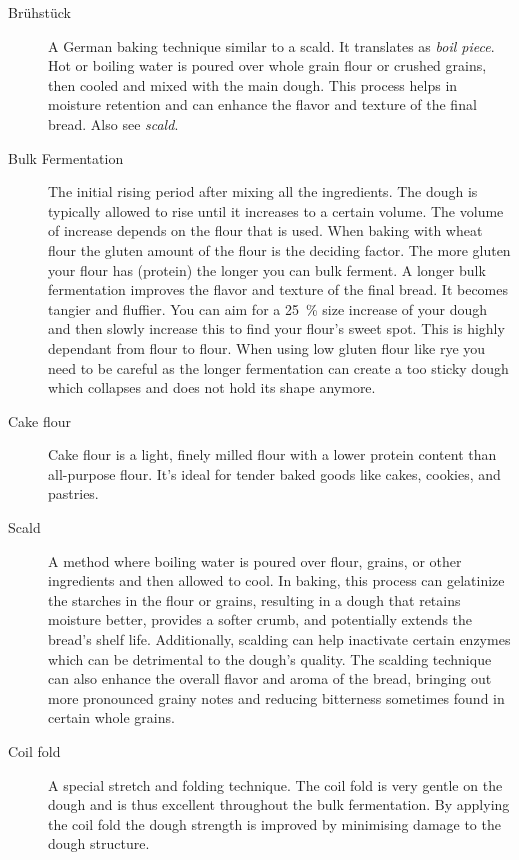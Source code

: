 \begin{description}
\item[Brühstück] A German baking technique similar to a scald. It translates as
\emph{boil piece}. Hot or boiling water is poured over whole grain flour or crushed grains,
then cooled and mixed with the main dough. This process helps in moisture retention
and can enhance the flavor and texture of the final bread. Also see \emph{scald}.

\item[Bulk Fermentation] The initial rising period after mixing all the ingredients.
The dough is typically allowed to rise until it increases to a certain volume. The
volume of increase depends on the flour that is used. When baking with wheat flour
the gluten amount of the flour is the deciding factor. The more gluten your flour has
(protein) the longer you can bulk ferment. A longer bulk fermentation improves the
flavor and texture of the final bread. It becomes tangier and fluffier. You can aim
for a \SI{25}{\percent} size increase of your dough and then slowly increase this to find your
flour’s sweet spot. This is highly dependant from flour to flour. When using low gluten
flour like rye you need to be careful as the longer fermentation can create a too
sticky dough which collapses and does not hold its shape anymore.

\item[Cake flour] Cake flour is a light, finely milled flour with a lower protein
content than all-purpose flour. It's ideal for tender baked goods like cakes, cookies,
and pastries.

\item[Scald] A method where boiling water is poured over flour, grains, or other
ingredients and then allowed to cool. In baking, this process can gelatinize the
starches in the flour or grains, resulting in a dough that retains moisture better,
provides a softer crumb, and potentially extends the bread's shelf life. Additionally,
scalding can help inactivate certain enzymes which can be detrimental to the dough's
quality. The scalding technique can also enhance the overall flavor and aroma of
the bread, bringing out more pronounced grainy notes and reducing bitterness
sometimes found in certain whole grains.

\item[Coil fold] A special stretch and folding technique. The coil fold is
very gentle on the dough and is thus excellent throughout the bulk fermentation.
By applying the coil fold the dough strength is improved by minimising damage
to the dough structure.


\end{description}
